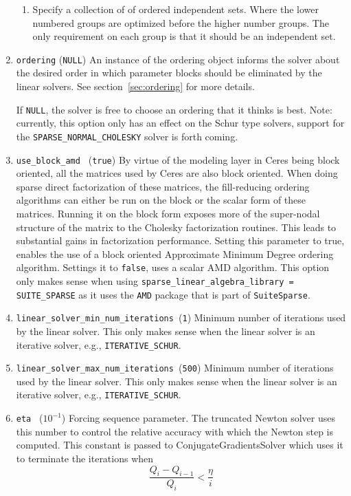 \begin{enumerate}
\begin{enumerate}
\item Specify a collection of of ordered independent sets. Where the
  lower numbered groups are optimized before the higher number
  groups. The only requirement on each group is that it should be an
  independent set.
\end{enumerate}

\item{\texttt{ordering} (\texttt{NULL})} An instance of the ordering
  object informs the solver about the desired order in which parameter
  blocks should be eliminated by the linear solvers. See
  section~\ref{sec:ordering} for more details.

  If \texttt{NULL}, the solver is free to choose an ordering that it
  thinks is best. Note: currently, this option only has an effect on
  the Schur type solvers, support for the
  \texttt{SPARSE\_NORMAL\_CHOLESKY} solver is forth coming.

\item{\texttt{use\_block\_amd } (\texttt{true})} By virtue of the
  modeling layer in Ceres being block oriented, all the matrices used
  by Ceres are also block oriented.  When doing sparse direct
  factorization of these matrices, the fill-reducing ordering
  algorithms can either be run on the block or the scalar form of
  these matrices. Running it on the block form exposes more of the
  super-nodal structure of the matrix to the Cholesky factorization
  routines. This leads to substantial gains in factorization
  performance. Setting this parameter to true, enables the use of a
  block oriented Approximate Minimum Degree ordering
  algorithm. Settings it to \texttt{false}, uses a scalar AMD
  algorithm. This option only makes sense when using
  \texttt{sparse\_linear\_algebra\_library = SUITE\_SPARSE} as it uses
  the \texttt{AMD} package that is part of \texttt{SuiteSparse}.

\item{\texttt{linear\_solver\_min\_num\_iterations }}(\texttt{1})
  Minimum number of iterations used by the linear solver. This only
  makes sense when the linear solver is an iterative solver, e.g.,
  \texttt{ITERATIVE\_SCHUR}.

\item{\texttt{linear\_solver\_max\_num\_iterations }}(\texttt{500})
  Minimum number of iterations used by the linear solver. This only
  makes sense when the linear solver is an iterative solver, e.g.,
  \texttt{ITERATIVE\_SCHUR}.

\item{\texttt{eta }} ($10^{-1}$)
 Forcing sequence parameter. The truncated Newton solver uses this
 number to control the relative accuracy with which the Newton step is
 computed. This constant is passed to ConjugateGradientsSolver which
 uses it to terminate the iterations when
\begin{equation}
\frac{Q_i - Q_{i-1}}{Q_i} < \frac{\eta}{i}
\end{equation}


\end{enumerate}
